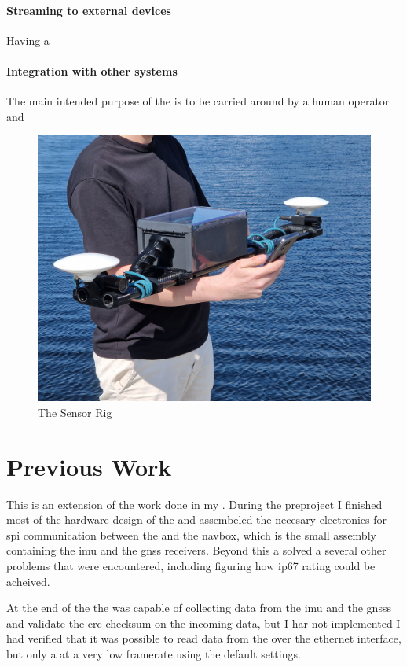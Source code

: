 \paragraph{Streaming to external devices}
Having a

\paragraph{Integration with other systems}
The main intended purpose of the \sr is to be carried around by a human operator and


\begin{figure}[H]
    \includegraphics[width=\textwidth]{figures/frontpage.jpg}
    \caption{The Sensor Rig}
\end{figure}

\section{Previous Work}
This \master is an extension of the work done in my \preproject \cite{martensPortableSensorRig2022}.
During the preproject I finished most of the hardware design of the \sr
and assembeled the necesary electronics for \gls{spi} communication between the \jx and the \gls{navbox}, which is the small assembly containing the \gls{imu} and the \gls{gnss} receivers.
Beyond this a solved a several other problems that were encountered, including figuring how \gls{ip67} rating could be acheived.

At the end of the \preproject the \sr was capable of collecting data from the \gls{imu} and the \glspl{gnss} and validate the \gls{crc} checksum on the incoming data, but I har not implemented
I had verified that it was possible to read data from the \cams over the ethernet interface, but only a at a very low framerate using the default settings.

